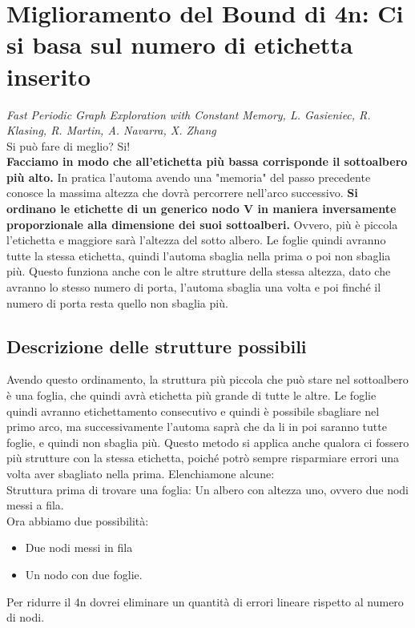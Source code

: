 \section{Miglioramento del Bound di 4n: Ci si basa sul numero di etichetta inserito}

\emph{Fast Periodic Graph Exploration
    with Constant Memory, L. Gasieniec, R. Klasing, R. Martin, A. Navarra, X.
    Zhang}\\

Si può fare di meglio? Si!\\ \textbf{Facciamo in modo che all'etichetta più
    bassa corrisponde il sottoalbero più alto.} In pratica l'automa avendo una
"memoria" del passo precedente conosce la massima altezza che dovrà percorrere
nell'arco successivo. \textbf{Si ordinano le etichette di un generico nodo V in
    maniera inversamente proporzionale alla dimensione dei suoi sottoalberi.}
Ovvero, più è piccola l'etichetta e maggiore sarà l'altezza del sotto albero. Le
foglie quindi avranno tutte la stessa etichetta, quindi l'automa sbaglia nella
prima o poi non sbaglia più. Questo funziona anche con le altre strutture della
stessa altezza, dato che avranno lo stesso numero di porta, l'automa sbaglia una
volta e poi finché il numero di porta resta quello non sbaglia più.

\subsection{Descrizione delle strutture possibili}
Avendo questo ordinamento, la struttura più piccola che può stare nel
sottoalbero è una foglia, che quindi avrà etichetta più grande di tutte le
altre. Le foglie quindi avranno etichettamento consecutivo e quindi è possibile
sbagliare nel primo arco, ma successivamente l'automa saprà che da li in poi
saranno tutte foglie, e quindi non sbaglia più. Questo metodo si applica anche
qualora ci fossero più strutture con la stessa etichetta, poiché potrò sempre
risparmiare errori una volta aver sbagliato nella prima. Elenchiamone alcune:\\
Struttura prima di trovare una foglia: Un albero con altezza uno, ovvero due
nodi messi a fila.\\
Ora abbiamo due possibilità:
\begin{itemize}
    \item Due nodi messi in fila
    \item Un nodo con due foglie.
\end{itemize}
Per ridurre il 4n dovrei eliminare un quantità di errori lineare rispetto al
numero di nodi.
